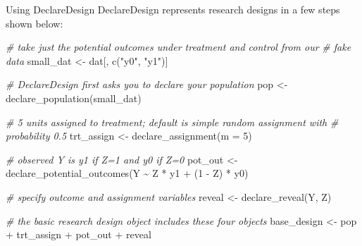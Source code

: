 \documentclass[
  ignorenonframetext,
]{beamer}
\newenvironment{Shaded}{\begin{snugshade}}{\end{snugshade}}
\newcommand{\AttributeTok}[1]{\textcolor[rgb]{0.77,0.63,0.00}{#1}}
\newcommand{\CommentTok}[1]{\textcolor[rgb]{0.56,0.35,0.01}{\textit{#1}}}
\newcommand{\DecValTok}[1]{\textcolor[rgb]{0.00,0.00,0.81}{#1}}
\newcommand{\FunctionTok}[1]{\textcolor[rgb]{0.00,0.00,0.00}{#1}}
\newcommand{\NormalTok}[1]{#1}
\newcommand{\OtherTok}[1]{\textcolor[rgb]{0.56,0.35,0.01}{#1}}
\newcommand{\SpecialCharTok}[1]{\textcolor[rgb]{0.00,0.00,0.00}{#1}}
\newcommand{\StringTok}[1]{\textcolor[rgb]{0.31,0.60,0.02}{#1}}
\begin{document}
\begin{frame}[fragile]{Using DeclareDesign}
\protect\hypertarget{using-declaredesign}{}
DeclareDesign represents research designs in a few steps shown below:

\scriptsize

\begin{Shaded}
\begin{Highlighting}[]
\CommentTok{\# take just the potential outcomes under treatment and control from our}
\CommentTok{\# fake data}
\NormalTok{small\_dat }\OtherTok{\textless{}{-}}\NormalTok{ dat[, }\FunctionTok{c}\NormalTok{(}\StringTok{"y0"}\NormalTok{, }\StringTok{"y1"}\NormalTok{)]}

\CommentTok{\# DeclareDesign first asks you to declare your population}
\NormalTok{pop }\OtherTok{\textless{}{-}} \FunctionTok{declare\_population}\NormalTok{(small\_dat)}

\CommentTok{\# 5 units assigned to treatment; default is simple random assignment with}
\CommentTok{\# probability 0.5}
\NormalTok{trt\_assign }\OtherTok{\textless{}{-}} \FunctionTok{declare\_assignment}\NormalTok{(}\AttributeTok{m =} \DecValTok{5}\NormalTok{)}

\CommentTok{\# observed Y is y1 if Z=1 and y0 if Z=0}
\NormalTok{pot\_out }\OtherTok{\textless{}{-}} \FunctionTok{declare\_potential\_outcomes}\NormalTok{(Y }\SpecialCharTok{\textasciitilde{}}\NormalTok{ Z }\SpecialCharTok{*}\NormalTok{ y1 }\SpecialCharTok{+}\NormalTok{ (}\DecValTok{1} \SpecialCharTok{{-}}\NormalTok{ Z) }\SpecialCharTok{*}\NormalTok{ y0)}

\CommentTok{\# specify outcome and assignment variables}
\NormalTok{reveal }\OtherTok{\textless{}{-}} \FunctionTok{declare\_reveal}\NormalTok{(Y, Z)}

\CommentTok{\# the basic research design object includes these four objects}
\NormalTok{base\_design }\OtherTok{\textless{}{-}}\NormalTok{ pop }\SpecialCharTok{+}\NormalTok{ trt\_assign }\SpecialCharTok{+}\NormalTok{ pot\_out }\SpecialCharTok{+}\NormalTok{ reveal}
\end{Highlighting}
\end{Shaded}

\normalsize
\end{frame}
\end{document}
